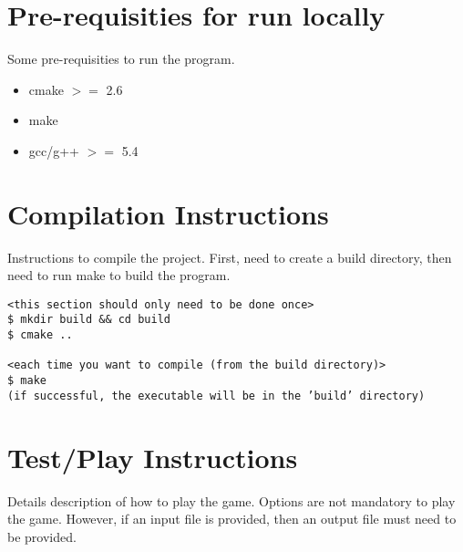 \documentclass[twoside,10pt]{article}
\begin{document}
\section*{Pre-requisities for run locally}

Some pre-requisities to run the program.

\begin{itemize}
    \item cmake $>=$ 2.6
    \item make
    \item gcc/g++ $>=$ 5.4
\end{itemize}

\section*{Compilation Instructions}

Instructions to compile the project. First, need to create a build directory, then need to run make to build the program.

\begin{tcolorbox}[boxrule=0pt]
    \begin{verbatim}
<this section should only need to be done once>
$ mkdir build && cd build
$ cmake ..

<each time you want to compile (from the build directory)>
$ make
(if successful, the executable will be in the ’build’ directory)

\end{verbatim}
\end{tcolorbox}


\section*{Test/Play Instructions}

Details description of how to play the game. Options are not mandatory to play the game. However, if an input file is provided, then an output file must need to be provided.
\end{document}

